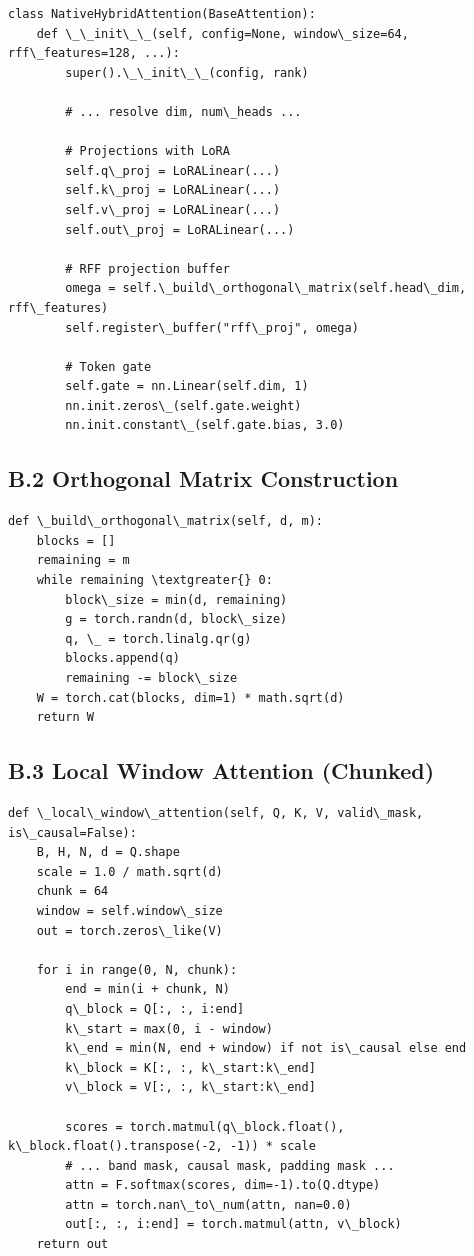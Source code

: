 \begin{lstlisting}
class NativeHybridAttention(BaseAttention):
    def \_\_init\_\_(self, config=None, window\_size=64, rff\_features=128, ...):
        super().\_\_init\_\_(config, rank)
        
        # ... resolve dim, num\_heads ...
        
        # Projections with LoRA
        self.q\_proj = LoRALinear(...)
        self.k\_proj = LoRALinear(...)
        self.v\_proj = LoRALinear(...)
        self.out\_proj = LoRALinear(...)
        
        # RFF projection buffer
        omega = self.\_build\_orthogonal\_matrix(self.head\_dim, rff\_features)
        self.register\_buffer("rff\_proj", omega)
        
        # Token gate
        self.gate = nn.Linear(self.dim, 1)
        nn.init.zeros\_(self.gate.weight)
        nn.init.constant\_(self.gate.bias, 3.0)
\end{lstlisting}

\subsection{B.2 Orthogonal Matrix Construction}

\begin{lstlisting}
def \_build\_orthogonal\_matrix(self, d, m):
    blocks = []
    remaining = m
    while remaining \textgreater{} 0:
        block\_size = min(d, remaining)
        g = torch.randn(d, block\_size)
        q, \_ = torch.linalg.qr(g)
        blocks.append(q)
        remaining -= block\_size
    W = torch.cat(blocks, dim=1) * math.sqrt(d)
    return W
\end{lstlisting}

\subsection{B.3 Local Window Attention (Chunked)}

\begin{lstlisting}
def \_local\_window\_attention(self, Q, K, V, valid\_mask, is\_causal=False):
    B, H, N, d = Q.shape
    scale = 1.0 / math.sqrt(d)
    chunk = 64
    window = self.window\_size
    out = torch.zeros\_like(V)
    
    for i in range(0, N, chunk):
        end = min(i + chunk, N)
        q\_block = Q[:, :, i:end]
        k\_start = max(0, i - window)
        k\_end = min(N, end + window) if not is\_causal else end
        k\_block = K[:, :, k\_start:k\_end]
        v\_block = V[:, :, k\_start:k\_end]
        
        scores = torch.matmul(q\_block.float(), k\_block.float().transpose(-2, -1)) * scale
        # ... band mask, causal mask, padding mask ...
        attn = F.softmax(scores, dim=-1).to(Q.dtype)
        attn = torch.nan\_to\_num(attn, nan=0.0)
        out[:, :, i:end] = torch.matmul(attn, v\_block)
    return out
\end{lstlisting}

